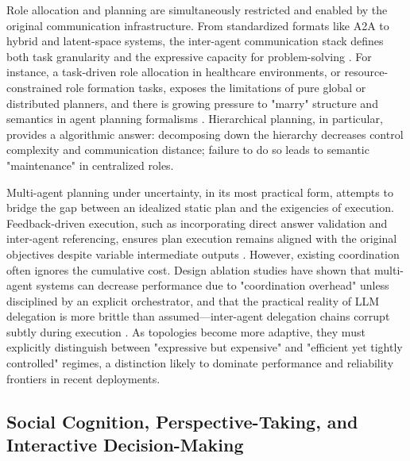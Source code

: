 \documentclass[11pt,a4paper]{article}
\begin{document}
Role allocation and planning are simultaneously restricted and enabled by the original communication infrastructure. From standardized formats like A2A to hybrid and latent-space systems, the inter-agent communication stack defines both task granularity and the expressive capacity for problem-solving \cite{arxiv:2511.09149v5,arxiv:2502.14321v3}. For instance, a task-driven role allocation in healthcare environments, or resource-constrained role formation tasks, exposes the limitations of pure global or distributed planners, and there is growing pressure to "marry" structure and semantics in agent planning formalisms \cite{arxiv:2411.14033v2,arxiv:2602.03695v2}. Hierarchical planning, in particular, provides a algorithmic answer: decomposing down the hierarchy decreases control complexity and communication distance; failure to do so leads to semantic "maintenance" in centralized roles.

Multi-agent planning under uncertainty, in its most practical form, attempts to bridge the gap between an idealized static plan and the exigencies of execution. Feedback-driven execution, such as incorporating direct answer validation and inter-agent referencing, ensures plan execution remains aligned with the original objectives despite variable intermediate outputs \cite{arxiv:2412.05449v1}. However, existing coordination often ignores the cumulative cost. Design ablation studies have shown that multi-agent systems can decrease performance due to "coordination overhead" unless disciplined by an explicit orchestrator, and that the practical reality of LLM delegation is more brittle than assumed---inter-agent delegation chains corrupt subtly during execution \cite{arxiv:2410.02506v1}. As topologies become more adaptive, they must explicitly distinguish between "expressive but expensive" and "efficient yet tightly controlled" regimes, a distinction likely to dominate performance and reliability frontiers in recent deployments.


\subsection{Social Cognition, Perspective-Taking, and Interactive Decision-Making}
\end{document}
